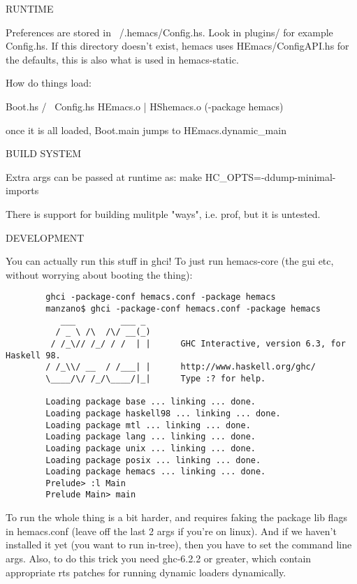 RUNTIME

Preferences are stored in ~/.hemacs/Config.hs. Look in plugins/ for
example Config.hs. If this directory doesn't exist, hemacs uses
HEmacs/ConfigAPI.hs for the defaults, this is also what is used in
hemacs-static.

How do things load:
        
           Boot.hs
          /      \
      Config.hs HEmacs.o
                  |
                HShemacs.o (-package hemacs)

once it is all loaded, Boot.main jumps to HEmacs.dynamic\_main

BUILD SYSTEM

Extra args can be passed at runtime as: make HC\_OPTS=-ddump-minimal-imports

There is support for building mulitple "ways", i.e. prof, but it is
untested.

DEVELOPMENT

You can actually run this stuff in ghci! To just run hemacs-core (the gui etc,
without worrying about booting the thing):

\begin{verbatim}
        ghci -package-conf hemacs.conf -package hemacs
        manzano$ ghci -package-conf hemacs.conf -package hemacs
           ___         ___ _
          / _ \ /\  /\/ __(_)
         / /_\// /_/ / /  | |      GHC Interactive, version 6.3, for Haskell 98.
        / /_\\/ __  / /___| |      http://www.haskell.org/ghc/
        \____/\/ /_/\____/|_|      Type :? for help.

        Loading package base ... linking ... done.
        Loading package haskell98 ... linking ... done.
        Loading package mtl ... linking ... done.
        Loading package lang ... linking ... done.
        Loading package unix ... linking ... done.
        Loading package posix ... linking ... done.
        Loading package hemacs ... linking ... done.
        Prelude> :l Main
        Prelude Main> main
\end{verbatim}

To run the whole thing is a bit harder, and requires faking the
package lib flags in hemacs.conf (leave off the last 2 args if you're
on linux). And if we haven't installed it yet (you want to run
in-tree), then you have to set the command line args. Also, to do this
trick you need ghc-6.2.2 or greater, which contain appropriate rts
patches for running dynamic loaders dynamically.

